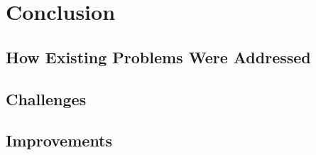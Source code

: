 \section{Conclusion}

\subsection{How Existing Problems Were Addressed}

\subsection{Challenges}

\subsection{Improvements}

\newpage
